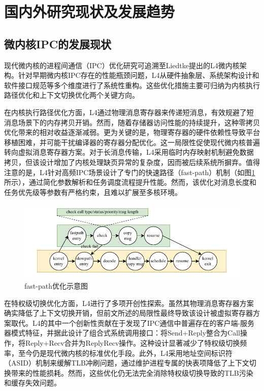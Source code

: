\section{国内外研究现状及发展趋势}

\subsection{微内核IPC的发展现状}

现代微内核的进程间通信（IPC）优化研究可追溯至Liedtke提出的L4微内核架构。针对早期微内核IPC存在的性能瓶颈问题，L4从硬件抽象层、系统架构设计和软件接口规范等多个维度进行了系统性重构。这些优化措施主要可归纳为内核执行路径优化和上下文切换优化两个关键方向。

在内核执行路径优化方面，L4通过物理消息寄存器来传递短消息，有效规避了短消息场景下的内存拷贝开销。然而，随着存储器访问性能的持续提升，这种零拷贝优化带来的相对收益逐渐减弱。更为关键的是，物理寄存器的硬件依赖性导致平台移植困难，并可能干扰编译器的寄存器分配优化\cite{heiser2016l4}。这一局限性促使现代微内核普遍转向虚拟消息寄存器方案。对于长消息传输，L4采用临时内存映射机制避免数据拷贝，但该设计增加了内核处理缺页异常的复杂度\cite{heiser2016l4}，因而被后续系统所摒弃。值得注意的是，L4针对高频IPC场景设计了专门的快速路径（fast-path）机制（如图\ref{fig:fast-path}所示），通过简化参数解析和任务调度流程提升性能。然而，该优化对消息长度和任务优先级等参数有严格约束，且难以扩展至多核环境。

\begin{figure}[htbp]
    \centering
    \includegraphics[width=1.0\textwidth]{figures/fast-path.drawio.pdf}
    \caption{fast-path优化示意图}\label{fig:fast-path}
\end{figure}

在特权级切换优化方面，L4进行了多项开创性探索。虽然其物理消息寄存器方案确实降低了上下文切换开销，但前文所述的局限性最终导致该设计被虚拟寄存器方案取代\cite{heiser2016l4}。L4的其中一个创新性贡献在于发现了IPC通信中普遍存在的客户端-服务器模式特征，并据此设计了组合式系统调用接口：将Send+Reply整合为Call操作，将Reply+Recv合并为ReplyRecv操作。这种设计显著减少了特权级切换频率，至今仍是现代微内核的标准优化手段。此外，L4采用地址空间标识符（ASID）机制来缓解TLB冲刷问题，通过维护进程专属的快表项降低了上下文切换带来的性能损耗。然而，这些优化仍无法完全消除特权级切换导致的TLB污染和缓存失效问题。

